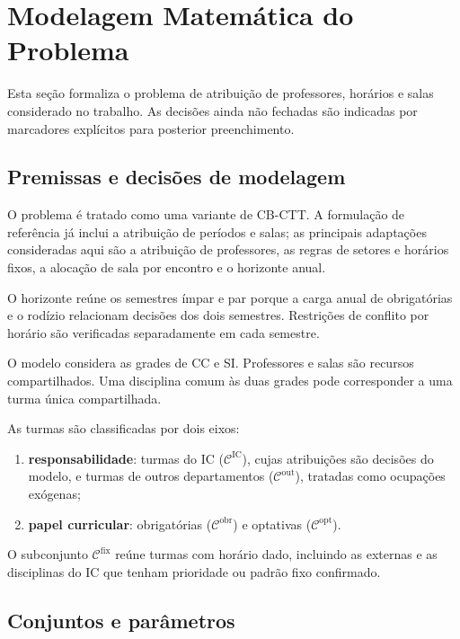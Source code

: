 \section{Modelagem Matemática do Problema}
\label{sec:modelagem}

Esta seção formaliza o problema de atribuição de professores, horários e salas considerado no trabalho. As decisões ainda não fechadas são indicadas por marcadores explícitos para posterior preenchimento.

\subsection{Premissas e decisões de modelagem}
\label{subsec:premissas_modelagem}

O problema é tratado como uma variante de CB-CTT. A formulação de referência já inclui a atribuição de períodos e salas; as principais adaptações consideradas aqui são a atribuição de professores, as regras de setores e horários fixos, a alocação de sala por encontro e o horizonte anual.

O horizonte reúne os semestres ímpar e par porque a carga anual de obrigatórias e o rodízio relacionam decisões dos dois semestres. Restrições de conflito por horário são verificadas separadamente em cada semestre.

O modelo considera as grades de CC e SI. Professores e salas são recursos compartilhados. Uma disciplina comum às duas grades pode corresponder a uma turma única compartilhada. 

As turmas são classificadas por dois eixos:
\begin{enumerate}
    \item \textbf{responsabilidade}: turmas do IC ($\mathcal{C}^{\mathrm{IC}}$), cujas atribuições são decisões do modelo, e turmas de outros departamentos ($\mathcal{C}^{\mathrm{out}}$), tratadas como ocupações exógenas;
    \item \textbf{papel curricular}: obrigatórias ($\mathcal{C}^{\mathrm{obr}}$) e optativas ($\mathcal{C}^{\mathrm{opt}}$).
\end{enumerate}

O subconjunto $\mathcal{C}^{\mathrm{fix}}$ reúne turmas com horário dado, incluindo as externas e as disciplinas do IC que tenham prioridade ou padrão fixo confirmado.

\subsection{Conjuntos e parâmetros}
\label{subsec:conjuntos_parametros}


